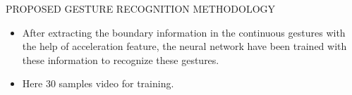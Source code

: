 \documentclass{beamer}
\begin{document}
\begin{frame}{PROPOSED GESTURE RECOGNITION
METHODOLOGY}
\begin{itemize}

\item After extracting the boundary information in the continuous
gestures with the help of acceleration feature, the neural
network have been
trained with these information to recognize these gestures.
\linebreak 
\item Here 30 samples video for training.  

\end{itemize}
\end{frame}

%
%
%
%
%
%
%
%
%
%
\end{document}
